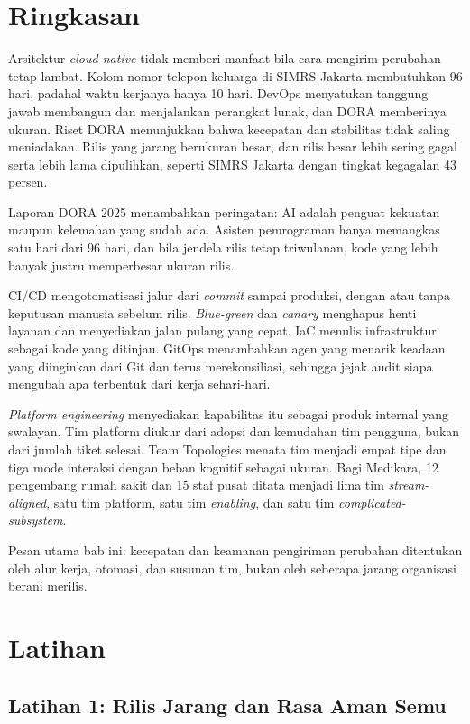 \section{Ringkasan}

Arsitektur \textit{cloud-native} tidak memberi manfaat bila cara mengirim perubahan tetap lambat.
Kolom nomor telepon keluarga di SIMRS Jakarta membutuhkan 96 hari, padahal waktu kerjanya hanya 10
hari. DevOps menyatukan tanggung jawab membangun dan menjalankan perangkat lunak, dan DORA
memberinya ukuran. Riset DORA menunjukkan bahwa kecepatan dan stabilitas tidak saling meniadakan.
Rilis yang jarang berukuran besar, dan rilis besar lebih sering gagal serta lebih lama dipulihkan,
seperti SIMRS Jakarta dengan tingkat kegagalan 43 persen.

Laporan DORA 2025 menambahkan peringatan: AI adalah penguat kekuatan maupun kelemahan yang sudah
ada. Asisten pemrograman hanya memangkas satu hari dari 96 hari, dan bila jendela rilis tetap
triwulanan, kode yang lebih banyak justru memperbesar ukuran rilis.

CI/CD mengotomatisasi jalur dari \textit{commit} sampai produksi, dengan atau tanpa keputusan
manusia sebelum rilis. \textit{Blue-green} dan \textit{canary} menghapus henti layanan dan
menyediakan jalan pulang yang cepat. IaC menulis infrastruktur sebagai kode yang ditinjau. GitOps
menambahkan agen yang menarik keadaan yang diinginkan dari Git dan terus merekonsiliasi, sehingga
jejak audit siapa mengubah apa terbentuk dari kerja sehari-hari.

\textit{Platform engineering} menyediakan kapabilitas itu sebagai produk internal yang swalayan.
Tim platform diukur dari adopsi dan kemudahan tim pengguna, bukan dari jumlah tiket selesai. Team
Topologies menata tim menjadi empat tipe dan tiga mode interaksi dengan beban kognitif sebagai
ukuran. Bagi Medikara, 12 pengembang rumah sakit dan 15 staf pusat ditata menjadi lima tim
\textit{stream-aligned}, satu tim platform, satu tim \textit{enabling}, dan satu tim
\textit{complicated-subsystem}.

Pesan utama bab ini: kecepatan dan keamanan pengiriman perubahan ditentukan oleh alur kerja,
otomasi, dan susunan tim, bukan oleh seberapa jarang organisasi berani merilis.

\section{Latihan}

\subsection*{Latihan 1: Rilis Jarang dan Rasa Aman Semu}

